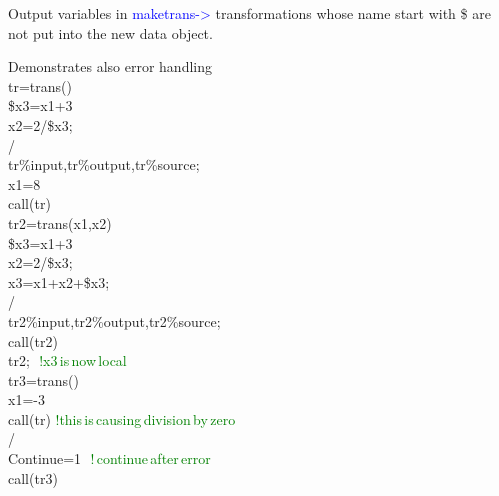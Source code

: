 \begin{note}
Output variables in \textcolor{blue}{maketrans->} transformations whose name start with \$ are not put into the new data object.
\end{note}
\begin{example}[transex]Demonstrates also error handling\\
\label{transex}
tr=\textcolor{VioletRed}{trans}()\\
\$x3=x1+3\\
x2=2/\$x3;\\
/\\
tr\%input,tr\%output,tr\%source;\\
x1=8\\
\textcolor{VioletRed}{call}(tr)\\
tr2=\textcolor{VioletRed}{trans}(x1,x2)\\
\$x3=x1+3\\
x2=2/\$x3;\\
x3=x1+x2+\$x3;\\
/\\
tr2\%input,tr2\%output,tr2\%source;\\
\textcolor{VioletRed}{call}(tr2)\\
tr2; \,\,\textcolor{green}{!x3\,is\,now\,local}\\
tr3=\textcolor{VioletRed}{trans}()\\
x1=-3\\
\textcolor{VioletRed}{call}(tr) \textcolor{green}{!this\,is\,causing\,division\,by\,zero}\\
/\\
Continue=1 \,\,\textcolor{green}{!\,continue\,after\,error}\\
\textcolor{VioletRed}{call}(tr3)
\end{example}
\color{Green}
